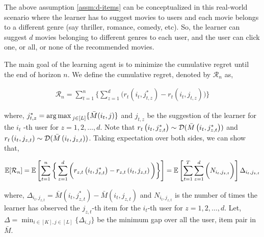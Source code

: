 The above assumption \ref{assm:d-items} can be conceptualized in this real-world scenario where the learner has  to suggest movies to users and each movie belongs to a different genre (say thriller, romance, comedy, etc). So, the learner can suggest $d$ movies belonging to different genres to each user, and the user can click one, or all, or none of the recommended movies.


The main goal of the learning agent is to minimize the cumulative regret until the end of horizon $n$. We define the cumulative regret, denoted by $\mathcal{R}_n$ as,

\begin{align*}
\mathcal{R}_n = \sum_{t=1}^{n}\bigg\lbrace \sum_{z=1}^{d} \bigg( r_{t}\left(i_{t}, j^*_{t,z} \right) - r_{t}\left( i_{t}, j_{t,z}\right)\bigg)\bigg\rbrace
\end{align*}

where, $j^*_{t,z} = \operatorname*{arg\,max\,}_{j\in [L]}\lbrace \bar{M}(i_t,j)\rbrace$ and $j_{t,z}$ be the suggestion of the learner for the $i_t$ -th user for  $z=1,2,\ldots, d$. Note that $r_{t}\left(i_t, j^*_{z,t} \right)\sim \mathcal{D}(\bar{M}\left(i_t, j^*_{z,t} \right))$ and $r_{t}\left(i_t, j_{z,t} \right)\sim \mathcal{D}(\bar{M}\left(i_t, j_{z,t} \right))$. Taking expectation over both sides, we can show that,

\begin{align*}
\mathbb{E}[\mathcal{R}_n] = \mathbb{E}\left [ \sum_{t=1}^{n}\bigg\lbrace\sum_{z=1}^{d} \bigg( r_{z,t}\left(i_t, j^*_{z,t} \right) - r_{z, t}\left( i_t, j_{z, t}\right)\bigg)\bigg\rbrace\right] = \mathbb{E}\left [ \sum_{t=1}^{T} \sum_{z=1}^{d} \bigg( N_{i_t,j_{z,t}}\bigg) \right ]\Delta_{i_t,j_{z,t}}
\end{align*}

where, $\Delta_{i_t,j_{z,t}} = \bar{M}(i_t,j^*_{z,t}) - \bar{M}(i_t,j_{z,t})$ and $N_{i_t,j_{z,t}}$ is the number of times the learner has observed the $j_{z,t}$-th item for the $i_t$-th user for $z=1,2,\ldots, d$. Let, $\Delta = \min_{i\in[K],j\in[L]}\lbrace \Delta_{i,j}\rbrace$ be the minimum gap over all the user, item pair in $\bar{M}$.
